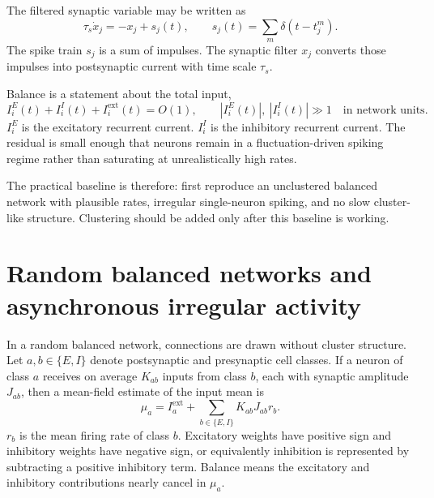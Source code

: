 The filtered synaptic variable may be written as
%
\begin{equation}
  \tau_s \dot x_j
  =
  -x_j+s_j(t),
  \qquad
  s_j(t)=\sum_m\delta(t-t_j^m).
  \label{eq:lkd-synaptic-filter}
\end{equation}
%
The spike train $s_j$ is a sum of impulses. The synaptic filter $x_j$ converts those impulses into postsynaptic current with time scale $\tau_s$.

Balance is a statement about the total input,
%
\begin{equation}
  I_i^{E}(t)+I_i^{I}(t)+I_i^{\mathrm{ext}}(t)
  =
  O(1),
  \qquad
  |I_i^{E}(t)|,\ |I_i^{I}(t)| \gg 1
  \quad
  \text{in network units}.
  \label{eq:balanced-cancellation}
\end{equation}
%
$I_i^E$ is the excitatory recurrent current. $I_i^I$ is the inhibitory recurrent current. The residual is small enough that neurons remain in a fluctuation-driven spiking regime rather than saturating at unrealistically high rates.

The practical baseline is therefore: first reproduce an unclustered balanced network with plausible rates, irregular single-neuron spiking, and no slow cluster-like structure. Clustering should be added only after this baseline is working.

\section{Random balanced networks and asynchronous irregular activity}
\label{sec:random-balanced-networks-ai-activity}

In a random balanced network, connections are drawn without cluster structure. Let $a,b\in\{E,I\}$ denote postsynaptic and presynaptic cell classes. If a neuron of class $a$ receives on average $K_{ab}$ inputs from class $b$, each with synaptic amplitude $J_{ab}$, then a mean-field estimate of the input mean is
%
\begin{equation}
  \mu_a
  =
  I_a^{\mathrm{ext}}
  +
  \sum_{b\in\{E,I\}} K_{ab}J_{ab}r_b .
  \label{eq:balanced-mean-input}
\end{equation}
%
$r_b$ is the mean firing rate of class $b$. Excitatory weights have positive sign and inhibitory weights have negative sign, or equivalently inhibition is represented by subtracting a positive inhibitory term. Balance means the excitatory and inhibitory contributions nearly cancel in $\mu_a$.

